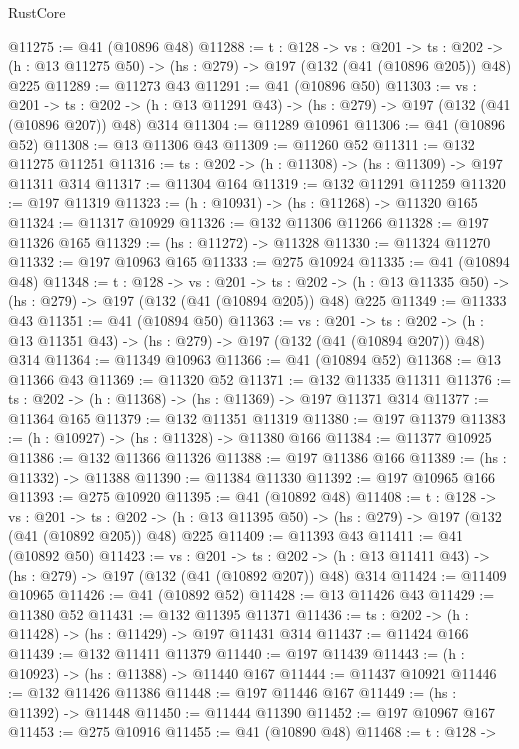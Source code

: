\begin{lexlean}{RustCore}
\begin{coremodule}
@11275 := @41 (@10896 @48)
@11288 := {t : @128} ->
  {vs : @201} ->
  {ts : @202} -> (h : @13 @11275 @50) -> (hs : @279) -> @197 (@132 (@41 (@10896 @205)) @48) @225
@11289 := @11273 @43
@11291 := @41 (@10896 @50)
@11303 := {vs : @201} ->
  {ts : @202} -> (h : @13 @11291 @43) -> (hs : @279) -> @197 (@132 (@41 (@10896 @207)) @48) @314
@11304 := @11289 @10961
@11306 := @41 (@10896 @52)
@11308 := @13 @11306 @43
@11309 := @11260 @52
@11311 := @132 @11275 @11251
@11316 := {ts : @202} -> (h : @11308) -> (hs : @11309) -> @197 @11311 @314
@11317 := @11304 @164
@11319 := @132 @11291 @11259
@11320 := @197 @11319
@11323 := (h : @10931) -> (hs : @11268) -> @11320 @165
@11324 := @11317 @10929
@11326 := @132 @11306 @11266
@11328 := @197 @11326 @165
@11329 := (hs : @11272) -> @11328
@11330 := @11324 @11270
@11332 := @197 @10963 @165
@11333 := @275 @10924
@11335 := @41 (@10894 @48)
@11348 := {t : @128} ->
  {vs : @201} ->
  {ts : @202} -> (h : @13 @11335 @50) -> (hs : @279) -> @197 (@132 (@41 (@10894 @205)) @48) @225
@11349 := @11333 @43
@11351 := @41 (@10894 @50)
@11363 := {vs : @201} ->
  {ts : @202} -> (h : @13 @11351 @43) -> (hs : @279) -> @197 (@132 (@41 (@10894 @207)) @48) @314
@11364 := @11349 @10963
@11366 := @41 (@10894 @52)
@11368 := @13 @11366 @43
@11369 := @11320 @52
@11371 := @132 @11335 @11311
@11376 := {ts : @202} -> (h : @11368) -> (hs : @11369) -> @197 @11371 @314
@11377 := @11364 @165
@11379 := @132 @11351 @11319
@11380 := @197 @11379
@11383 := (h : @10927) -> (hs : @11328) -> @11380 @166
@11384 := @11377 @10925
@11386 := @132 @11366 @11326
@11388 := @197 @11386 @166
@11389 := (hs : @11332) -> @11388
@11390 := @11384 @11330
@11392 := @197 @10965 @166
@11393 := @275 @10920
@11395 := @41 (@10892 @48)
@11408 := {t : @128} ->
  {vs : @201} ->
  {ts : @202} -> (h : @13 @11395 @50) -> (hs : @279) -> @197 (@132 (@41 (@10892 @205)) @48) @225
@11409 := @11393 @43
@11411 := @41 (@10892 @50)
@11423 := {vs : @201} ->
  {ts : @202} -> (h : @13 @11411 @43) -> (hs : @279) -> @197 (@132 (@41 (@10892 @207)) @48) @314
@11424 := @11409 @10965
@11426 := @41 (@10892 @52)
@11428 := @13 @11426 @43
@11429 := @11380 @52
@11431 := @132 @11395 @11371
@11436 := {ts : @202} -> (h : @11428) -> (hs : @11429) -> @197 @11431 @314
@11437 := @11424 @166
@11439 := @132 @11411 @11379
@11440 := @197 @11439
@11443 := (h : @10923) -> (hs : @11388) -> @11440 @167
@11444 := @11437 @10921
@11446 := @132 @11426 @11386
@11448 := @197 @11446 @167
@11449 := (hs : @11392) -> @11448
@11450 := @11444 @11390
@11452 := @197 @10967 @167
@11453 := @275 @10916
@11455 := @41 (@10890 @48)
@11468 := {t : @128} ->

\end{coremodule}
\end{lexlean}
